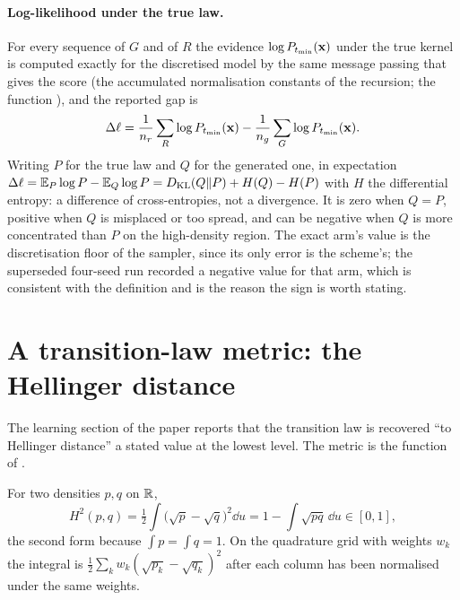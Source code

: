 \paragraph{Log-likelihood under the true law.} For every sequence of $G$ and of $R$
the evidence $\log P_{t_{\min}}(\mathbf{x})$ under the true kernel is computed exactly for the
discretised model by the same message passing that gives the score (the accumulated
normalisation constants of the recursion; the function ), and the
reported gap is
\begin{equation}
  \Delta\ell=\frac1{n_r}\sum_{R}\log P_{t_{\min}}(\mathbf{x})-\frac1{n_g}\sum_{G}\log P_{t_{\min}}(\mathbf{x}).
  \label{eq:rev:llgap}
\end{equation}
Writing $P$ for the true law and $Q$ for the generated one, in expectation
$\Delta\ell=\mathbb{E}_P\log P-\mathbb{E}_Q\log P=D_{\mathrm{KL}}(Q\|P)+H(Q)-H(P)$ with $H$ the differential
entropy: a difference of cross-entropies, not a divergence. It is zero when $Q=P$,
positive when $Q$ is misplaced or too spread, and can be negative when $Q$ is more
concentrated than $P$ on the high-density region. The exact arm's value is the
discretisation floor of the sampler, since its only error is the scheme's; the
superseded four-seed run recorded a negative value for that arm, which is consistent
with the definition and is the reason the sign is worth stating.

\section{A transition-law metric: the Hellinger distance}
\label{sec:rev:hellinger}

The learning section of the paper reports that the transition law is recovered ``to
Hellinger distance'' a stated value at the lowest level. The metric is the
function  of
.

\begin{definition}
\label{def:rev:hellinger}
For two densities $p,q$ on $\mathbb{R}$,
\[
  H^2(p,q)=\tfrac12\int\bigl(\sqrt{p}-\sqrt{q}\bigr)^2\dd u=1-\int\sqrt{pq}\,\dd u\in[0,1],
\]
the second form because $\int p=\int q=1$. On the quadrature grid with weights $w_k$
the integral is $\tfrac12\sum_kw_k(\sqrt{p_k}-\sqrt{q_k})^2$ after each column has been
normalised under the same weights.
\end{definition}

